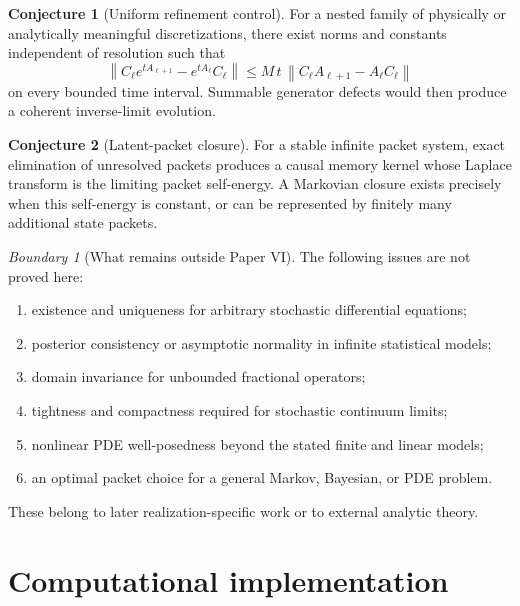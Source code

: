 \documentclass[11pt,letterpaper]{article}
\theoremstyle{plain}
\theoremstyle{plain}
\theoremstyle{plain}
\theoremstyle{definition}
\theoremstyle{definition}
\theoremstyle{definition}
\theoremstyle{definition}
\theoremstyle{definition}
\newtheorem{conjecture}[conjecture]{Conjecture}
\theoremstyle{remark}
\theoremstyle{remark}
\theoremstyle{remark}
\newtheorem{boundary}[boundary]{Boundary}
\theoremstyle{remark}
\theoremstyle{remark}
\newcommand{\norm}[1]{\left\lVert#1\right\rVert}
\theoremstyle{remark}
\begin{document}
\begin{conjecture}[Uniform refinement control]\label{core:record:048}
For a nested family of physically or analytically meaningful discretizations, there exist norms and constants independent of resolution such that
\[
\norm{C_\ell e^{tA_{\ell+1}}-e^{tA_\ell}C_\ell}
\le
M\,t\,\norm{C_\ell A_{\ell+1}-A_\ell C_\ell}
\]
on every bounded time interval. Summable generator defects would then produce a coherent inverse-limit evolution.
\end{conjecture}

\begin{conjecture}[Latent-packet closure]\label{core:record:049}
For a stable infinite packet system, exact elimination of unresolved packets produces a causal memory kernel whose Laplace transform is the limiting packet self-energy. A Markovian closure exists precisely when this self-energy is constant, or can be represented by finitely many additional state packets.
\end{conjecture}

\begin{boundary}[What remains outside Paper VI]\label{core:record:050}
The following issues are not proved here:
\begin{enumerate}[leftmargin=2em]
\item existence and uniqueness for arbitrary stochastic differential equations;
\item posterior consistency or asymptotic normality in infinite statistical models;
\item domain invariance for unbounded fractional operators;
\item tightness and compactness required for stochastic continuum limits;
\item nonlinear PDE well-posedness beyond the stated finite and linear models;
\item an optimal packet choice for a general Markov, Bayesian, or PDE problem.
\end{enumerate}
These belong to later realization-specific work or to external analytic theory.
\end{boundary}

\FloatBarrier
\section{Computational implementation}\label{core:section:18}
\end{document}
